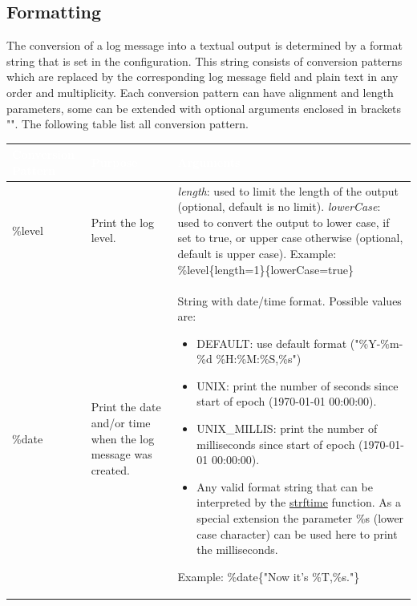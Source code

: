 \subsection{Formatting} \label{sec:formatting}
The conversion of a log message into a textual output is determined by a format string that is set in the configuration. This string consists of conversion patterns which are replaced by the corresponding log message field and plain text in any order and multiplicity. Each conversion pattern can have alignment and length parameters, some can be extended with optional arguments enclosed in brackets "{}". The following table list all conversion pattern.

\begin{table}[!htbp]
\begin{center}
\renewcommand{\arraystretch}{1.5}
\begin{tabularx}{\textwidth}{| p{} | p{} | X |}
\hline
\cellcolor{ibeo_red} \textcolor{white}{\textbf{Conversion Pattern}} & \cellcolor{ibeo_red} \textcolor{white}{\textbf{Purpose}} & \cellcolor{ibeo_red} \textcolor{white}{\textbf{Arguments}} \\

\hline
\%level & Print the log level. & 
\textit{length}: used to limit the length of the output (optional, default is no limit). \newline
\textit{lowerCase}: used to convert the output to lower case, if set to true, or upper case otherwise (optional, default is upper case).
\newline Example: \%level\{length=1\}\{lowerCase=true\}
\\

\hline
\%date & Print the date and/or time when the log message was created. & 
String with date/time format. Possible values are:
\begin{itemize}
	\item DEFAULT: use default format ("\%Y-\%m-\%d \%H:\%M:\%S,\%s")
	\item UNIX: print the number of seconds since start of epoch (1970-01-01 00:00:00).
	\item UNIX\_MILLIS: print the number of milliseconds since start of epoch (1970-01-01 00:00:00).
	\item Any valid format string that can be interpreted by the \href{http://www.cplusplus.com/reference/ctime/strftime/}{strftime} function. As a special extension the parameter \%s (lower case character) can be used here to print the milliseconds.
\end{itemize}
Example: \%date\{"Now it's \%T,\%s."\}
\\

\hline
\end{tabularx}
\end{center}
\end{table}



